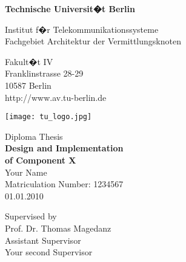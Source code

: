 \thispagestyle{empty}
\begin{center}

\vspace*{1.4cm}
{\LARGE \textbf{Technische Universit�t Berlin}}

\vspace{0.5cm}

{\large Institut f�r Telekommunikationssysteme\\[1mm]}
{\large Fachgebiet Architektur der Vermittlungsknoten\\[5mm]}

Fakult�t IV\\
Franklinstrasse 28-29\\
10587 Berlin\\
http://www.av.tu-berlin.de\\

\vspace*{1cm}

\texttt{[image: tu\_logo.jpg]}

\vspace*{1.0cm}

{\LARGE Diploma Thesis}\\

\vspace{1.0cm}
{\LARGE \textbf{Design and Implementation}}\\
\vspace*{0.3cm}
{\LARGE \textbf{of Component X}}\\
\vspace*{1.0cm}
{\LARGE Your Name}
\\
\vspace*{0.5cm}
Matriculation Number: 1234567\\
01.01.2010\\ %
\vspace*{1.0cm}

Supervised by\\
Prof. Dr. Thomas Magedanz\\
\vspace*{0.5cm}
Assistant Supervisor\\
Your second Supervisor
\vspace{3cm}


\end{center}

